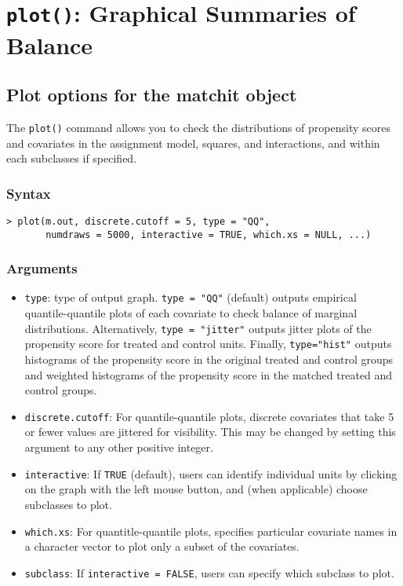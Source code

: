 \section{\texttt{plot()}: Graphical Summaries of Balance}


\subsection{Plot options for the matchit object}
The \texttt{plot()} command allows you to check the distributions of
propensity scores and covariates in the assignment model, squares, and
interactions, and within each subclasses if specified.

\subsubsection{Syntax}

\begin{verbatim}
> plot(m.out, discrete.cutoff = 5, type = "QQ", 
       numdraws = 5000, interactive = TRUE, which.xs = NULL, ...)
\end{verbatim}

\subsubsection{Arguments}

\begin{itemize}
\item {\tt type}: type of output graph. \texttt{type = "QQ"}
  (default) outputs empirical quantile-quantile plots of each
  covariate to check balance of marginal distributions. Alternatively,
  \texttt{type = "jitter"} outputs jitter plots of the propensity
  score for treated and control units.  Finally, \texttt{type="hist"} outputs  
  histograms of the propensity score in the original treated and control groups
  and weighted histograms of the propensity score in the matched treated and control groups.
  
\item {\tt discrete.cutoff}: For quantile-quantile plots, discrete
  covariates that take 5 or fewer values are jittered for visibility.
  This may be changed by setting this argument to any other positive
  integer.
  
\item {\tt interactive}: If \texttt{TRUE} (default), users can
  identify individual units by clicking on the graph with the left
  mouse button, and (when applicable) choose subclasses to plot.
  
\item {\tt which.xs}: For quantitle-quantile plots, specifies particular covariate names in a
  character vector to plot only a subset of the covariates.

\item {\tt subclass}: If \texttt{interactive = FALSE}, users can
  specify which subclass to plot. 

\end{itemize}


